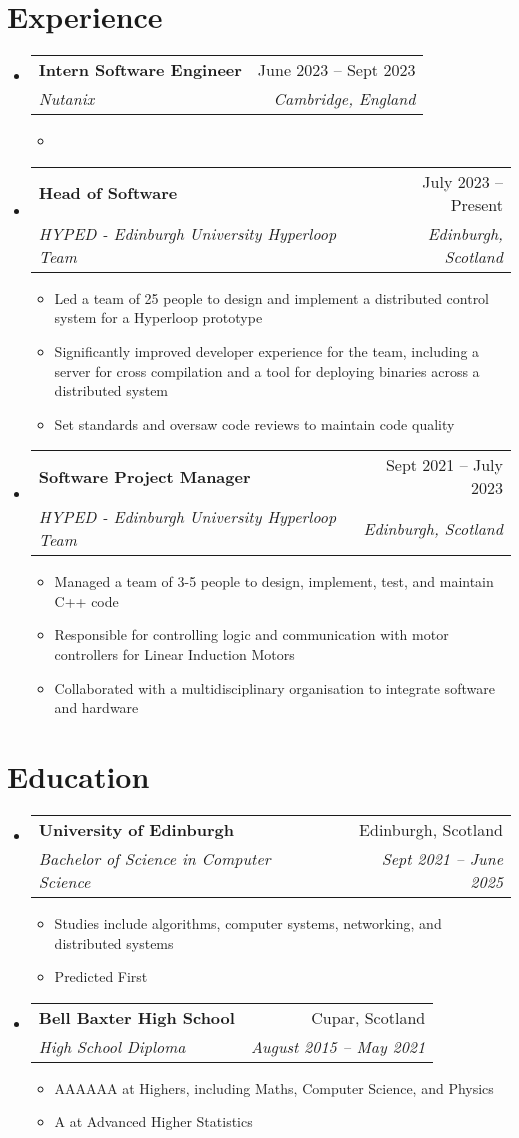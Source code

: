 \documentclass[a4paper,11pt]{article}
\makeatletter
\newcommand{\resumeItem}[1]{
  \item\small{#1}
}
\newcommand{\resumeItemListStart}{\begin{itemize}[rightmargin=0.11in]}
\newcommand{\resumeItemListEnd}{\end{itemize}}
\newcommand{\resumeQuadHeading}[4]{
  \item
  \begin{tabular*}{0.96\textwidth}[t]{l@{\extracolsep{\fill}}r}
    \textbf{#1} & #2 \\
    \textit{\small#3} & \textit{\small #4} \\
  \end{tabular*}
}
\newcommand{\resumeHeadingListStart}{
  \begin{itemize}[leftmargin=0.15in, label={}]
}
\newcommand{\resumeHeadingListEnd}{\end{itemize}}
\makeatother
\begin{document}
\section{Experience}
\resumeHeadingListStart{}
  \resumeQuadHeading{Intern Software Engineer}{June 2023 -- Sept 2023}
  {Nutanix}{Cambridge, England}
    \resumeItemListStart{}
      \resumeItem{}
    \resumeItemListEnd
  \resumeQuadHeading{Head of Software}{July 2023 -- Present}
  {HYPED - Edinburgh University Hyperloop Team}{Edinburgh, Scotland}
    \resumeItemListStart{}
      \resumeItem{Led a team of 25 people to design and implement a distributed control system for a Hyperloop prototype}
      \resumeItem{Significantly improved developer experience for the team, including a server for cross compilation and a tool for deploying binaries across a distributed system}
      \resumeItem{Set standards and oversaw code reviews to maintain code quality}
    \resumeItemListEnd{}  
  \resumeQuadHeading{Software Project Manager}{Sept 2021 -- July 2023}
  {HYPED - Edinburgh University Hyperloop Team}{Edinburgh, Scotland}
    \resumeItemListStart{}
      \resumeItem{Managed a team of 3-5 people to design, implement, test, and maintain C++ code}
      \resumeItem{Responsible for controlling logic and communication with motor controllers for Linear Induction Motors}
      \resumeItem{Collaborated with a multidisciplinary organisation to integrate software and hardware}
    \resumeItemListEnd{}
\resumeHeadingListEnd{}



\section{Education}
  \resumeHeadingListStart{}
    \resumeQuadHeading{University of Edinburgh}{Edinburgh, Scotland}
    {Bachelor of Science in Computer Science}{Sept 2021 -- June 2025}
      \resumeItemListStart{}
        \resumeItem{Studies include algorithms, computer systems, networking, and distributed systems}
        \resumeItem{Predicted First}
      \resumeItemListEnd{}
    \resumeQuadHeading{Bell Baxter High School}{Cupar, Scotland}
    {High School Diploma}{August 2015 -- May 2021}
        \resumeItemListStart{}
            \resumeItem{AAAAAA at Highers, including Maths, Computer Science, and Physics}
            \resumeItem{A at Advanced Higher Statistics}
        \resumeItemListEnd{}
  \resumeHeadingListEnd{}
\end{document}

